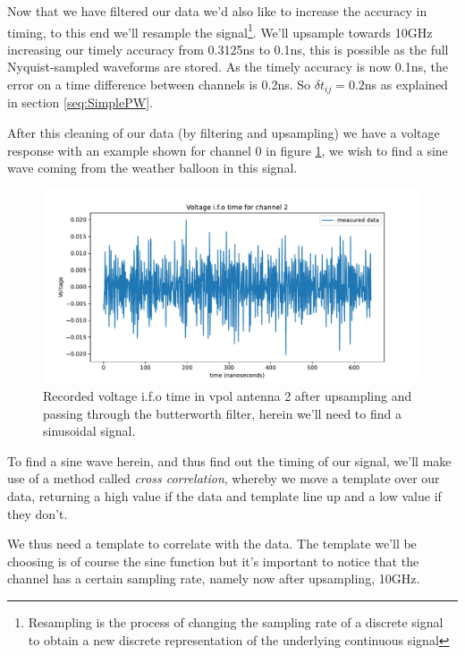 Now that we have filtered our data we'd also like to increase the accuracy in
timing, to this end we'll resample the signal\footnote{Resampling is the process of
changing the sampling rate of a discrete signal to obtain a new discrete
representation of the underlying continuous signal}. We'll upsample towards 10GHz
increasing our timely accuracy from 0.3125ns to 0.1ns, this is possible as the
full Nyquist-sampled waveforms are stored\cite{Allison_2019}.  As the timely accuracy
is now 0.1ns, the error on a time difference between channels is 0.2ns. So
$\delta t_{ij}=0.2$ns as explained in section \ref{seq:SimplePW}.

After this cleaning of
our data (by filtering and upsampling) we have a voltage response with an example 
shown for channel 0 in figure \ref{fig:VoltageAfterFilter}, we wish to find a sine
wave coming from the weather balloon in this signal.
\begin{figure}
	\centering
	\includegraphics[width=\textwidth]{figures/VoltageAfterFilter.pdf}
	\caption{Recorded voltage i.f.o time in vpol antenna 2 after upsampling and passing through the butterworth filter, herein we'll need to find a sinusoidal signal.}
	\label{fig:VoltageAfterFilter}
\end{figure}
To find a sine wave herein, and thus find out the timing of our signal, we'll
make use of a method called \textit{cross correlation}, whereby we move a
template over our data, returning a high value if the data and template line up
and a low value if they don't.

We thus need a template to correlate with the data. The template we'll be choosing is
of course the sine function but it's important to notice that the channel has a
certain sampling rate, namely now after upsampling, 10GHz. 

